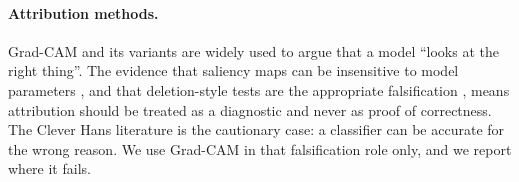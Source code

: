 \paragraph{Attribution methods.} Grad-CAM \citep{selvaraju2017gradcam} and its
variants \citep{chattopadhyay2018gradcampp} are widely used to argue that a model
``looks at the right thing''. The evidence that saliency maps can be insensitive
to model parameters \citep{adebayo2018sanity}, and that deletion-style tests are
the appropriate falsification \citep{samek2017evaluating}, means attribution
should be treated as a diagnostic and never as proof of correctness. The
Clever Hans literature \citep{lapuschkin2019unmasking} is the cautionary case: a
classifier can be accurate for the wrong reason. We use Grad-CAM in that
falsification role only, and we report where it fails.
